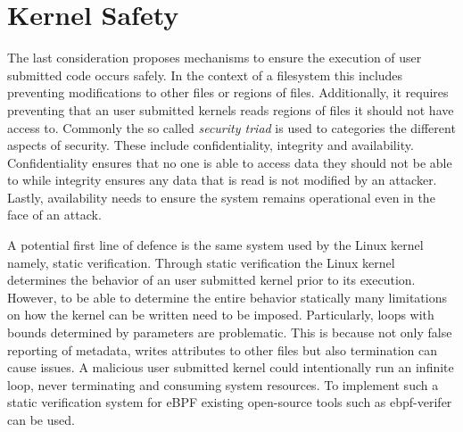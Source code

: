

\section{Kernel Safety}

The last consideration proposes mechanisms to ensure the execution of user
submitted code occurs safely. In the context of a filesystem this includes
preventing modifications to other files or regions of files. Additionally, it
requires preventing that an user submitted kernels reads regions of files it
should not have access to. Commonly the so called \textit{security triad} is
used to categories the different aspects of security. These
include confidentiality, integrity and availability. Confidentiality ensures
that no one is able to access data they should not be able to while integrity
ensures any data that is read is not modified by an attacker. Lastly,
availability needs to ensure the system remains operational even in the face of
an attack.

A potential first line of defence is the same system used by the Linux kernel
namely, static verification. Through static verification the Linux kernel
determines the behavior of an user submitted kernel prior to its execution.
However, to be able to determine the entire behavior statically many limitations
on how the kernel can be written need to be imposed. Particularly, loops with
bounds determined by parameters are problematic. This is because not only
false reporting of metadata, writes attributes to other files but also
termination can cause issues. A malicious user submitted kernel could
intentionally run an infinite loop, never terminating and consuming system
resources. To implement such a static verification system for eBPF existing
open-source tools such as ebpf-verifer \cite{ebpf-verifier} can be used.

